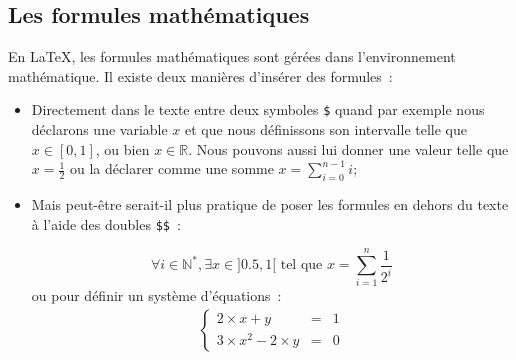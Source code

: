 \documentclass[a4paper, 12pt]{book}
\begin{document}
\subsection{Les formules mathématiques}
En \LaTeX, les formules mathématiques sont gérées dans l'environnement
mathématique. Il existe deux manières d'insérer des formules~:
\begin{itemize}
  \item Directement dans le texte entre deux symboles \texttt{\$}
    quand par exemple nous déclarons une variable $x$ et que nous
    définissons son intervalle telle que $x \in [0,1]$, ou bien $x \in
    \mathbb{R}$. Nous pouvons aussi lui donner une valeur telle que $x
    = \frac{1}{2}$ ou la déclarer comme une somme $x =
    \sum_{i=0}^{n-1}i$;
  \item Mais peut-être serait-il plus pratique de poser les formules
    en dehors du texte à l'aide des doubles \texttt{\$\$}~:
    
    $$ \forall i \in \mathbb{N}^{*}, \exists x \in ]0.5, 1[ \mbox{~tel que~} x = \sum_{i=1}^{n}\frac{1}{2^i} $$
        ou pour définir un système d'équations~:
        \begin{eqnarray}
        \left\{
        \begin{array}{lll}
          2\times{}x + y &= &1\\
          3\times{}x^2 - 2\times{}y &= &0
        \end{array}
        \right.
        \end{eqnarray}
\end{itemize}
\end{document}
